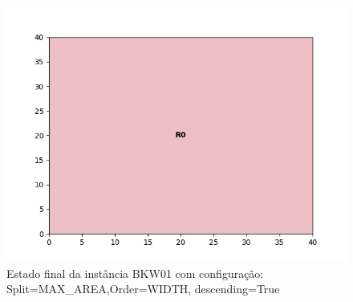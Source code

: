 \begin{figure}[H]
    \centering
    \caption[]{Estado final da instância BKW01 com configuração: Split=MAX_AREA,Order=WIDTH, descending=True}
    \label{fig:bkw01-max_area-width-true}
    \includegraphics[scale=0.5]{output/figures/bkw/bkw01/max_area/width/true/00}
\end{figure}